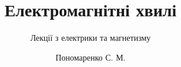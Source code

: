 \documentclass[onlytextwidth]{beamer}
\title[Лекції електрики та магнетизму]{\huge\bfseries Електромагнітні хвилі}
\subtitle{Лекції з електрики та магнетизму}
\author{Пономаренко С. М.}
\date{}
\begin{document}
\begin{frame}[plain]
	\maketitle
\end{frame}



%


%
%

\end{document}
